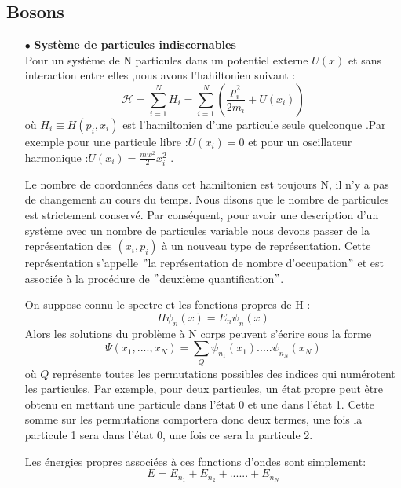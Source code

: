 \documentclass[12pt,a4paper, openany]{report}
\begin{document}
\subsection{Bosons}
\begin{flushleft}
	\setlength\parindent{3mm}
	\begin{itemize}
		\item[$\bullet$] \textbf{Système de particules indiscernables} \\ Pour un système de N particules dans un potentiel externe $U(x)$ et sans interaction entre elles ,nous avons l'hahiltonien suivant :
\begin{equation}
	\mathcal{H}=\sum_{i=1}^{N}H_i=\sum_{i=1}^{N}(\frac{p_i^2}{2m_i}+U(x_i))
\end{equation}
où $H_i\equiv H(p_i,x_i)$ est l'hamiltonien d'une particule seule quelconque .Par exemple pour une particule libre :$U(x_i)=0$ et pour un oscillateur harmonique :$U(x_i)=\frac{mw^2}{2}x_i^2$ .\par Le nombre de coordonnées dans cet hamiltonien est toujours N, il n’y a pas de changement au cours du temps. Nous disons que le nombre de particules est strictement conservé. Par conséquent, pour avoir une description d’un système avec un nombre de particules variable nous devons passer de la représentation des $ (x_i,p_i)$ à un nouveau type de représentation. Cette représentation s'appelle ${"}$la représentation de nombre d'occupation${"}$ et est associée à la procédure de ${"}$deuxième quantiﬁcation${"}$.\par On suppose connu le spectre et les fonctions propres de H :
\begin{equation}
	H{\psi}_n(x)=E_n{\psi_n(x)}
\end{equation}
Alors les solutions du problème à N corps peuvent s'écrire sous la forme 
\begin{equation}
	\Psi(x_1,....,x_N)=\sum_{Q}{\psi}_{n_1}(x_1).....{\psi}_{n_N}(x_N)
\end{equation}
où $Q$ représente toutes les permutations possibles des indices qui numérotent les particules. Par exemple, pour deux particules, un état propre peut \^{e}tre obtenu en mettant une particule dans l'état 0 et une dans l'état 1. Cette somme sur les permutations comportera donc deux termes, une fois la particule 1 sera dans l'état 0, une fois ce sera la particule 2.\par Les énergies propres associées à ces fonctions d'ondes sont simplement: 
\begin{equation}
	E=E_{n_1}+E_{n_2}+......+E_{n_N}

\end{equation}
\end{itemize}
\end{flushleft}
\end{document}
